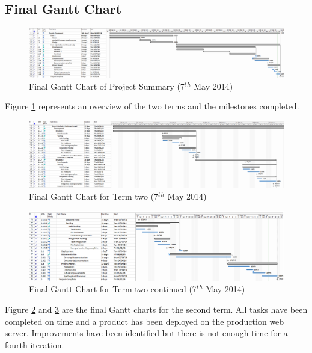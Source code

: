 \begin{landscape}
\newpage
\subsection{Final Gantt Chart}

\begin{figure}[H]
  \centering
  \includegraphics[width=\linewidth]{images/gant_chart_final_overview.png}
  \caption{Final Gantt Chart of Project Summary (7$^t$$^h$ May 2014)}
  \label{fig:ganttfinaloverview}
\end{figure}

Figure \ref{fig:ganttfinaloverview} represents an overview of the two terms and 
the milestones completed.

\begin{figure}[H]
  \centering
  \includegraphics[width=\linewidth]{images/final_term2_1.png}
  \caption{Final Gantt Chart for Term two (7$^t$$^h$ May 2014)}
  \label{fig:ganttfinalterm21}
\end{figure}

\begin{figure}[H]
  \centering
  \includegraphics[width=\linewidth]{images/final_term2_2.png}
  \caption{Final Gantt Chart for Term two continued (7$^t$$^h$ May 2014)}
  \label{fig:ganttfinalterm22}
\end{figure}

Figure \ref{fig:ganttfinalterm21} and \ref{fig:ganttfinalterm22} are the final Gantt charts for the second term. 
All tasks have been completed on time and a product has been deployed on the 
production web server. Improvements have been identified but there is not enough
time for a fourth iteration.

\end{landscape}
